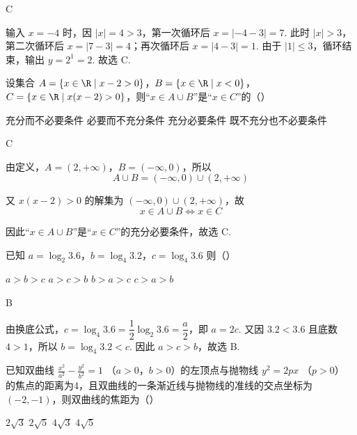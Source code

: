 \begin{answer}
C
\end{answer}

\begin{solution}
输入 \(x=-4\) 时，因 \(\lvert x\rvert=4>3\)，第一次循环后 \(x=\lvert-4-3\rvert=7\). 此时 \(\lvert x\rvert>3\)，第二次循环后 \(x=\lvert7-3\rvert=4\)；再次循环后 \(x=\lvert4-3\rvert=1\). 由于 \(\lvert1\rvert\leqslant3\)，循环结束，输出 \(y=2^1=2\). 故选 C.
\end{solution}

\begin{problem}
设集合 \(A = \{x \in \R \mid x - 2 > 0\}\)，\(B = \{x \in \R \mid x < 0\}\)，\(C = \{x \in \R \mid x(x - 2) > 0\}\)，则“\(x \in A \cup B\)”是“\(x \in C\)”的（\quad）

\choices
    {充分而不必要条件}
    {必要而不充分条件}
    {充分必要条件}
    {既不充分也不必要条件}
\end{problem}

\begin{answer}
C
\end{answer}

\begin{solution}
由定义，\(A=(2,+\infty)\)，\(B=(-\infty,0)\)，所以
\[
A\cup B=(-\infty,0)\cup(2,+\infty)
\]

又 \(x(x-2)>0\) 的解集为 \((-\infty,0)\cup(2,+\infty)\)，故
\[
x\in A\cup B\Longleftrightarrow x\in C
\]

因此“\(x\in A\cup B\)”是“\(x\in C\)”的充分必要条件，故选 C.
\end{solution}

\begin{problem}
已知 \(a = \log_2 3.6\)，\(b = \log_4 3.2\)，\(c = \log_4 3.6\) 则（\quad）

\choices
    {\(a > b > c\)}
    {\(a > c > b\)}
    {\(b > a > c\)}
    {\(c > a > b\)}
\end{problem}

\begin{answer}
B
\end{answer}

\begin{solution}
由换底公式，\(c=\log_4 3.6=\dfrac{1}{2}\log_2 3.6=\dfrac{a}{2}\)，即 \(a=2c\). 又因 \(3.2<3.6\) 且底数 \(4>1\)，所以 \(b=\log_4 3.2<c\). 因此 \(a>c>b\)，故选 B.
\end{solution}

\begin{problem}
已知双曲线 \(\frac{x^2}{a^{2}} - \frac{y^2}{b^{2}} = 1 \) （\(a > 0\)，\(b > 0\)）的左顶点与抛物线 \(y^2 = 2px\) （\(p > 0\)） 的焦点的距离为4，且双曲线的一条渐近线与抛物线的准线的交点坐标为 \((-2, -1)\)，则双曲线的焦距为（\quad）

\choices
    {\(2\sqrt{3}\)}
    {\(2\sqrt{5}\)}
    {\(4\sqrt{3}\)}
    {\(4\sqrt{5}\)}
\end{problem}

